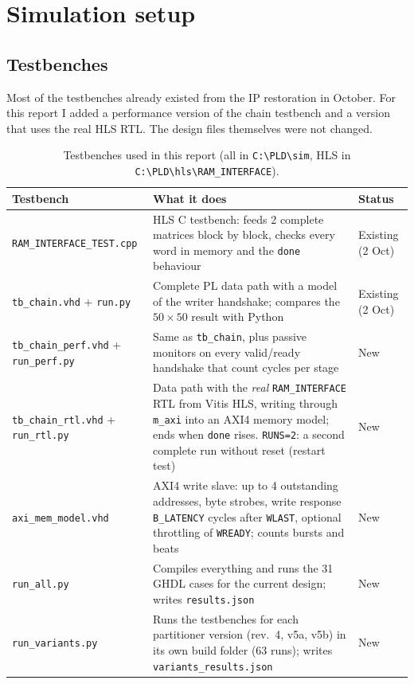 \documentclass[11pt,a4paper]{article}
\newcommand{\code}[1]{\texttt{#1}}
\begin{document}
\section{Simulation setup}

\subsection{Testbenches}
Most of the testbenches already existed from the IP restoration in October. For this report I added a performance version of the chain testbench and a version that uses the real HLS RTL. The design files themselves were not changed.

\begin{table}[h]
\centering
\begin{tabularx}{\textwidth}{@{}lYl@{}}
\toprule
\textbf{Testbench} & \textbf{What it does} & \textbf{Status} \\
\midrule
\code{RAM\_INTERFACE\_TEST.cpp} & HLS C testbench: feeds 2 complete matrices block by block, checks every word in memory and the \code{done} behaviour & Existing (2 Oct) \\
\code{tb\_chain.vhd} + \code{run.py} & Complete PL data path with a model of the writer handshake; compares the $50\times50$ result with Python & Existing (2 Oct) \\
\code{tb\_chain\_perf.vhd} + \code{run\_perf.py} & Same as \code{tb\_chain}, plus passive monitors on every valid/ready handshake that count cycles per stage & New \\
\code{tb\_chain\_rtl.vhd} + \code{run\_rtl.py} & Data path with the \emph{real} \code{RAM\_INTERFACE} RTL from Vitis HLS, writing through \code{m\_axi} into an AXI4 memory model; ends when \code{done} rises. \code{RUNS=2}: a second complete run without reset (restart test) & New \\
\code{axi\_mem\_model.vhd} & AXI4 write slave: up to 4 outstanding addresses, byte strobes, write response \code{B\_LATENCY} cycles after \code{WLAST}, optional throttling of \code{WREADY}; counts bursts and beats & New \\
\code{run\_all.py} & Compiles everything and runs the 31 GHDL cases for the current design; writes \code{results.json} & New \\
\code{run\_variants.py} & Runs the testbenches for each partitioner version (rev.~4, v5a, v5b) in its own build folder (63 runs); writes \code{variants\_results.json} & New \\
\bottomrule
\end{tabularx}
\caption{Testbenches used in this report (all in \code{C:\textbackslash PLD\textbackslash sim}, HLS in \code{C:\textbackslash PLD\textbackslash hls\textbackslash RAM\_INTERFACE}).}
\end{table}
\end{document}

